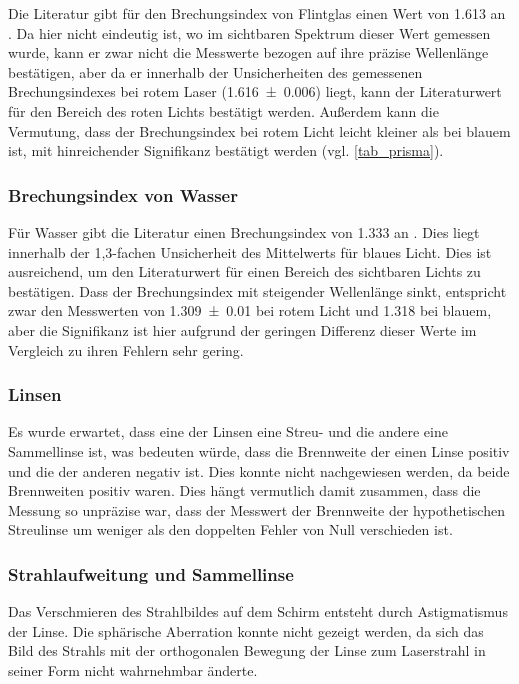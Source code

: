 \documentclass[
	a4paper,
	12pt,
	pagesize,
	ngerman
]{scrartcl}
\begin{document}
	Die Literatur gibt für den Brechungsindex von Flintglas einen Wert von \SI{1,613}{} an \cite{flintglasref}.
	Da hier nicht eindeutig ist, wo im sichtbaren Spektrum dieser Wert gemessen wurde, kann er zwar nicht die Messwerte bezogen auf ihre präzise Wellenlänge bestätigen, aber da er innerhalb der Unsicherheiten des gemessenen Brechungsindexes bei rotem Laser (\SI{1,616 \pm 0,006}{}) liegt, kann der Literaturwert für den Bereich des roten Lichts bestätigt werden.
	Außerdem kann die Vermutung, dass der Brechungsindex bei rotem Licht leicht kleiner als bei blauem ist, mit hinreichender Signifikanz bestätigt werden (vgl. \cref{tab_prisma}).
	
	\subsubsection{Brechungsindex von Wasser}
	Für Wasser gibt die Literatur einen Brechungsindex von \SI{1,333}{} an \cite{flintglasref}.
	Dies liegt innerhalb der 1,3-fachen Unsicherheit des Mittelwerts für blaues Licht.
	Dies ist ausreichend, um den Literaturwert für einen Bereich des sichtbaren Lichts zu bestätigen.
	Dass der Brechungsindex mit steigender Wellenlänge sinkt, entspricht zwar den Messwerten von \SI{1,309\pm 0,01}{} bei rotem Licht und \SI{1,318}{} bei blauem, aber die Signifikanz ist hier aufgrund der geringen Differenz dieser Werte im Vergleich zu ihren Fehlern sehr gering.
	
	\subsubsection{Linsen}
	
	Es wurde erwartet, dass eine der Linsen eine Streu- und die andere eine Sammellinse ist, was bedeuten würde, dass die Brennweite der einen Linse positiv und die der anderen negativ ist.
	Dies konnte nicht nachgewiesen werden, da beide Brennweiten positiv waren.
	Dies hängt vermutlich damit zusammen, dass die Messung so unpräzise war, dass der Messwert der Brennweite der hypothetischen Streulinse um weniger als den doppelten Fehler von Null verschieden ist.
	
	\subsubsection{Strahlaufweitung und Sammellinse}
	Das Verschmieren des Strahlbildes auf dem Schirm entsteht durch Astigmatismus der Linse. %
	Die sphärische Aberration konnte nicht gezeigt werden, da sich das Bild des Strahls mit der orthogonalen Bewegung der Linse zum Laserstrahl in seiner Form nicht wahrnehmbar änderte.
\end{document}
